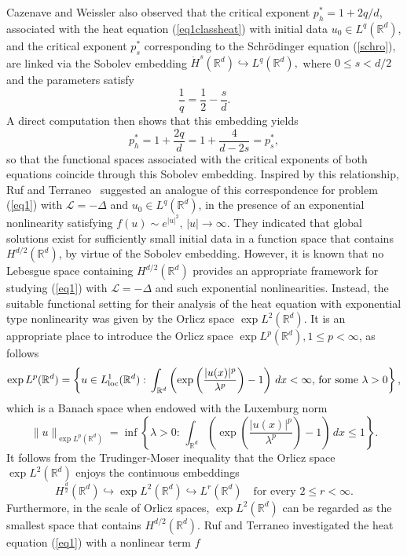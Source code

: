 \documentclass[a4paper,11pt]{amsart}
\renewcommand\eqref[1]{(\ref{#1})} %
\numberwithin{equation}{section}
\theoremstyle{plain}
\theoremstyle{definition}
\begin{document}
Cazenave and Weissler \cite{CW} also observed that the critical exponent $p_h^*= 1+2q/d$, associated with the heat equation \eqref{eq1classheat} with initial data $u_0\in L^q(\mathbb{R}^d)$, and the critical exponent $p_s^*$ corresponding to the Schr\"odinger equation \eqref{schro}, are linked via the Sobolev embedding $\dot H^s(\mathbb{R}^d)\hookrightarrow L^q(\mathbb{R}^d),$
where $0\le s<d/2$ and the parameters satisfy
\[
\frac{1}{q}=\frac{1}{2}-\frac{s}{d}.
\]
A direct computation then shows that this embedding yields
\[
p_h^* = 1+\frac{2q}{d} = 1+\frac{4}{d-2s} = p_s^*,
\]
so that the functional spaces associated with the critical exponents of both equations coincide through this Sobolev embedding. Inspired by this relationship, Ruf and Terraneo~\cite{RT} suggested an analogue of this correspondence for problem \eqref{eq1} with $\mathcal{L}=-\Delta$ and $u_0\in L^q(\mathbb{R}^d)$, in the presence of an exponential nonlinearity satisfying
$f(u)\sim e^{|u|^2},\, |u|\to\infty$. They indicated that global solutions exist for sufficiently small initial data in a function space that contains $H^{d/2}(\mathbb{R}^d)$, by virtue of the Sobolev embedding. However, it is known that no Lebesgue space containing $H^{d/2}(\mathbb{R}^d)$ provides an appropriate framework for studying \eqref{eq1} with $\mathcal{L}=-\Delta$ and such exponential nonlinearities. Instead, the suitable functional setting for their analysis of the heat equation with exponential type nonlinearity was given by the Orlicz space $\exp L^2(\mathbb{R}^d)$. It is an appropriate place to introduce the Orlicz space $\exp L^p(\mathbb{R}^d), 1\le p<\infty$, as follows 
$$\exp L^p(\mathbb{R}^d)=\left\{u\in L^1_{\mathrm{loc}}(\mathbb{R}^d):\,\int_{\mathbb{R}^d}\left(\exp\left(\frac{|u(x)|^p}{\lambda^p}\right)-1\right)\,dx<\infty,\, \textnormal{for some}\,\, \lambda>0\right\},$$
which is a Banach space when endowed with the Luxemburg norm\label{Luxnorm}
$$\|u\|_{\exp L^p(\mathbb{R}^d)}=\inf\left\{\lambda>0:\, \int_{\mathbb{R}^d}\left(\exp\left(\frac{|u(x)|^p}{\lambda^p}\right)-1\right)\,dx\leq 1\right\}.$$
It follows from the Trudinger-Moser inequality that the Orlicz space 
$\exp L^{2}(\mathbb{R}^{d})$ enjoys the continuous embeddings
\[
H^{\frac{d}{2}}(\mathbb{R}^{d}) \hookrightarrow \exp L^{2}(\mathbb{R}^{d}) 
\hookrightarrow L^{r}(\mathbb{R}^{d}) \quad \text{for every}\,\, 2 \le r < \infty .
\]
Furthermore, in the scale of Orlicz spaces, $\exp L^{2}(\mathbb{R}^{d})$ can be regarded as 
the smallest space that contains $H^{d/2}(\mathbb{R}^{d})$. Ruf and Terraneo \cite{RT} investigated the heat equation \eqref{eq1} with a nonlinear term $f$  
\end{document}
